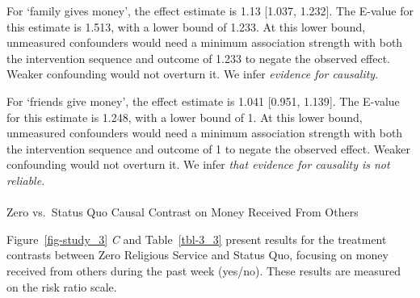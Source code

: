 \documentclass[
  single column]{article}
\makeatletter
\let\oldparagraph\paragraph
\renewcommand{\paragraph}{
    \@ifstar
      \xxxParagraphStar
      \xxxParagraphNoStar
  }
\newcommand{\xxxParagraphStar}[1]{\oldparagraph*{#1}\mbox{}}
\newcommand{\xxxParagraphNoStar}[1]{\oldparagraph{#1}\mbox{}}
\makeatother
\begin{document}
For `family gives money', the effect estimate is 1.13 {[}1.037,
1.232{]}. The E-value for this estimate is 1.513, with a lower bound of
1.233. At this lower bound, unmeasured confounders would need a minimum
association strength with both the intervention sequence and outcome of
1.233 to negate the observed effect. Weaker confounding would not
overturn it. We infer \emph{evidence for causality}.

For `friends give money', the effect estimate is 1.041 {[}0.951,
1.139{]}. The E-value for this estimate is 1.248, with a lower bound of
1. At this lower bound, unmeasured confounders would need a minimum
association strength with both the intervention sequence and outcome of
1 to negate the observed effect. Weaker confounding would not overturn
it. We infer \emph{that evidence for causality is not reliable}.

\paragraph{Zero vs.~Status Quo Causal Contrast on Money Received From
Others}\label{zero-vs.-status-quo-causal-contrast-on-money-received-from-others}

Figure~\ref{fig-study_3} \emph{C} and Table~\ref{tbl-3_3} present
results for the treatment contrasts between Zero Religious Service and
Status Quo, focusing on money received from others during the past week
(yes/no). These results are measured on the risk ratio scale.
\end{document}
